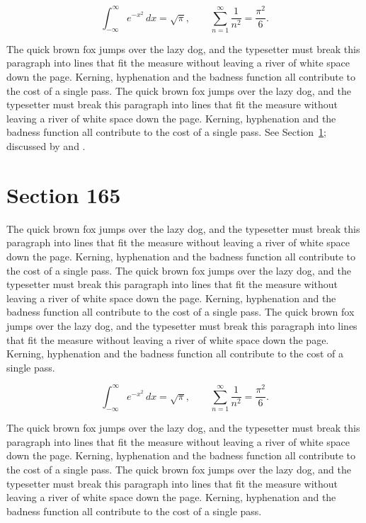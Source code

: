 \documentclass{article}
\begin{document}
\begin{equation}\label{eq:164}
\int_{-\infty}^{\infty} e^{-x^{2}}\,dx = \sqrt{\pi}, \qquad
\sum_{n=1}^{\infty} \frac{1}{n^{2}} = \frac{\pi^{2}}{6}.
\end{equation}

The quick brown fox jumps over the lazy dog, and the typesetter must break this paragraph into lines that fit the measure without leaving a river of white space down the page. Kerning, hyphenation and the badness function all contribute to the cost of a single pass. The quick brown fox jumps over the lazy dog, and the typesetter must break this paragraph into lines that fit the measure without leaving a river of white space down the page. Kerning, hyphenation and the badness function all contribute to the cost of a single pass. 
See Section~\ref{sec:165}; discussed by \textcite{k5} and \textcite{l2}.
\section{Section 165}
\label{sec:165}
The quick brown fox jumps over the lazy dog, and the typesetter must break this paragraph into lines that fit the measure without leaving a river of white space down the page. Kerning, hyphenation and the badness function all contribute to the cost of a single pass. The quick brown fox jumps over the lazy dog, and the typesetter must break this paragraph into lines that fit the measure without leaving a river of white space down the page. Kerning, hyphenation and the badness function all contribute to the cost of a single pass. The quick brown fox jumps over the lazy dog, and the typesetter must break this paragraph into lines that fit the measure without leaving a river of white space down the page. Kerning, hyphenation and the badness function all contribute to the cost of a single pass. 

\begin{equation}\label{eq:165}
\int_{-\infty}^{\infty} e^{-x^{2}}\,dx = \sqrt{\pi}, \qquad
\sum_{n=1}^{\infty} \frac{1}{n^{2}} = \frac{\pi^{2}}{6}.
\end{equation}

The quick brown fox jumps over the lazy dog, and the typesetter must break this paragraph into lines that fit the measure without leaving a river of white space down the page. Kerning, hyphenation and the badness function all contribute to the cost of a single pass. The quick brown fox jumps over the lazy dog, and the typesetter must break this paragraph into lines that fit the measure without leaving a river of white space down the page. Kerning, hyphenation and the badness function all contribute to the cost of a single pass. 
\end{document}
